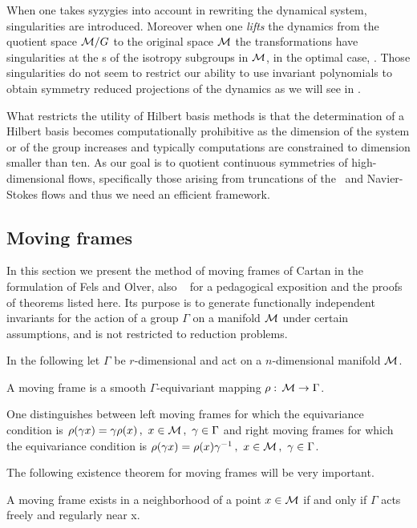 When one takes syzygies into account in rewriting the dynamical
system, singularities are introduced. Moreover when one
\emph{lifts} the dynamics from the quotient space $\mathcal{M}/G$ to
the original space $\mathcal{M}$ the transformations have
singularities at the \fixedsp s of the isotropy subgroups in
$\mathcal{M}$, in the optimal case, \cf {}. Those
singularities do not seem to restrict our ability to use
invariant polynomials to obtain symmetry reduced projections of
the dynamics as we will see in .

What restricts the utility of Hilbert basis methods is that the
determination of a Hilbert basis becomes computationally
prohibitive as the dimension of the system or of the group
increases and typically
computations are constrained to dimension smaller than ten. As
our goal is to quotient continuous symmetries of
high-dimensional flows, specifically those arising from
truncations of the \KS\ and Navier-Stokes flows
and thus we need an efficient framework.


\subsection{Moving frames}
\label{sec:mf}

In this section we present the method of moving frames of
Cartan in the formulation of Fels and
Olver, also \cf~
for a pedagogical exposition and the proofs of theorems
listed here. Its purpose is to generate functionally
independent invariants for the action of a group $\Gamma$ on
a manifold $\mathcal{M}$ under certain assumptions, and is not
restricted to reduction problems.

In the following let $\Gamma$ be $r$-dimensional and act on a $n$-dimensional manifold $\mathcal{M}$.
\begin{definition}
 A moving frame is a smooth $\Gamma$-equivariant mapping $\rho:\,\mathcal{M} \rightarrow \Gamma$.
\end{definition}
One distinguishes between left moving frames for which the equivariance condition is $\rho(\gamma x)=\gamma\rho(x)\,,\ x\in\mathcal{M}\,,\ \gamma\in\Gamma$ and right moving frames for which the equivariance condition is $\rho(\gamma x)=\rho(x)\gamma^{-1}\,,\ x\in\Manif\,,\ \gamma\in\Gamma$.

The following existence theorem for moving frames will be very important.

\begin{theorem}
 A moving frame exists in a neighborhood of a point $x\in \mathcal{M}$ if and
 only if $\Gamma$ acts freely and regularly near x.
\end{theorem}

